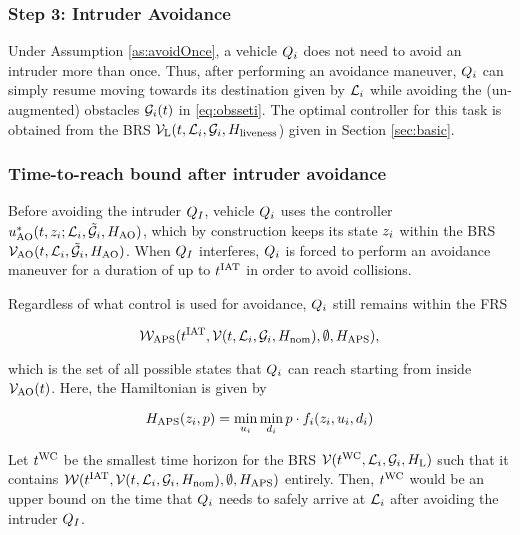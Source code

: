 \subsubsection{Step 3: Intruder Avoidance \label{sec:intruder_after}}
Under Assumption \ref{as:avoidOnce}, a vehicle $Q_{i}$ does not need to avoid an intruder more than once. Thus, after performing an avoidance maneuver, $Q_{i}$ can simply resume moving towards its destination given by $\mathcal{L}_i$ while avoiding the (un-augmented) obstacles $\mathcal{G}_i(t)$ in \eqref{eq:obsseti}. The optimal controller for this task is obtained from the BRS $\mathcal{V}_\text{L}(t, \mathcal{L}_i, \mathcal{G}_i, H_\text{liveness}$) given in Section \ref{sec:basic}.

\subsubsection{Time-to-reach bound after intruder avoidance}
Before avoiding the intruder $Q_{I}$, vehicle $Q_{i}$ uses the controller $u^*_\text{AO}(t, z_i; \mathcal{L}_i, \tilde{\mathcal{G}}_i, H_\text{AO})$, which by construction keeps its state $z_i$ within the BRS $\mathcal{V}_\text{AO}(t, \mathcal{L}_i, \tilde{\mathcal{G}}_i, H_\text{AO})$. When $Q_{I}$ interferes, $Q_{i}$ is forced to perform an avoidance maneuver for a duration of up to $t^\text{IAT}$ in order to avoid collisions. 

Regardless of what control is used for avoidance, $Q_{i}$ still remains within the FRS 

\begin{equation}
\mathcal{W}_\text{APS}(t^\text{IAT}, \mathcal{V}(t, \mathcal{L}_i, \mathcal{G}_i, H_\text{nom}), \emptyset, H_\text{APS}), 
\end{equation}

\noindent which is the set of all possible states that $Q_{i}$ can reach starting from inside $\mathcal{V}_\text{AO}(t)$. Here, the Hamiltonian is given by

\begin{equation}
H_\text{APS}(z_i, p) = \min_{u_i} \min_{d_i} p \cdot f_i (z_i, u_i, d_i)
\end{equation}

Let $t^\text{WC}$ be the smallest time horizon for the BRS $\mathcal{V}(t^\text{WC}, \mathcal{L}_i, \mathcal{G}_i, H_\text{L})$ such that it contains $\mathcal{W}(t^\text{IAT}, \mathcal{V}(t, \mathcal{L}_i, \mathcal{G}_i, H_\text{nom}), \emptyset, H_\text{APS})$ entirely. Then, $t^\text{WC}$ would be an upper bound on the time that $Q_{i}$ needs to safely arrive at $\mathcal{L}_i$ after avoiding the intruder $Q_{I}$.